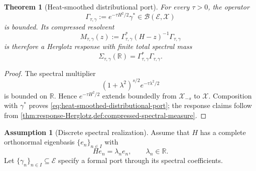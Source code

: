 \documentclass[11pt,reqno]{scrartcl}
\newcommand{\RR}{\mathbb R}
\newcommand{\scrX}{\mathscr X}
\newcommand{\scrE}{\mathscr E}
\theoremstyle{plain}
\newtheorem{theorem}{Theorem}[section]
\theoremstyle{definition}
\newtheorem{assumption}[assumption]{Assumption}
\theoremstyle{remark}
\begin{document}
\begin{theorem}[Heat-smoothed distributional port]
\label{thm:heat-smoothed-distributional-port}
For every \(\tau>0\), the operator
\begin{equation}
  \boxed{
  \Gamma_{\tau,\gamma}
  :=e^{-\tau H^2/2}\gamma^*
  \in\mathcal B(\scrE,\scrX)}
  \label{eq:heat-smoothed-distributional-port}
\end{equation}
is bounded.  Its compressed resolvent
\begin{equation}
  M_{\tau,\gamma}(z)
  :=\Gamma_{\tau,\gamma}^*(H-z)^{-1}
  \Gamma_{\tau,\gamma}
  \label{eq:heat-smoothed-distributional-response}
\end{equation}
is therefore a Herglotz response with finite total spectral mass
\begin{equation}
  \Sigma_{\tau,\gamma}(\RR)
  =\Gamma_{\tau,\gamma}^*\Gamma_{\tau,\gamma}.
\end{equation}
\end{theorem}

\begin{proof}
The spectral multiplier
\begin{equation}
  (1+\lambda^2)^{s/2}e^{-\tau\lambda^2/2}
\end{equation}
is bounded on \(\RR\).  Hence \(e^{-\tau H^2/2}\) extends boundedly from
\(\scrX_{-s}\) to \(\scrX\).  Composition with \(\gamma^*\) proves
\eqref{eq:heat-smoothed-distributional-port}; the response claims follow from
\cref{thm:response-Herglotz,def:compressed-spectral-measure}.
\end{proof}

\begin{assumption}[Discrete spectral realization]
\label{ass:discrete-response-spectrum}
Assume that \(H\) has a complete orthonormal eigenbasis
\(\{e_n\}_{n\in I}\) with
\begin{equation}
  He_n=\lambda_ne_n,
  \qquad \lambda_n\in\RR.
  \label{eq:discrete-spectrum}
\end{equation}
Let \(\{\gamma_n\}_{n\in I}\subseteq\scrE\) specify a formal port through
its spectral coefficients.
\end{assumption}
\end{document}
